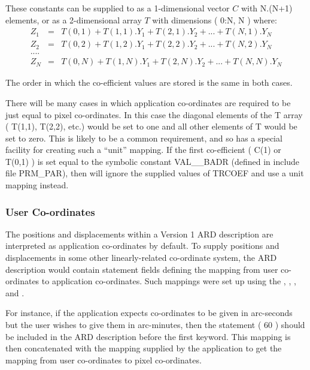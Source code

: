 These constants can be supplied to  as a 1-dimensional vector 
$C$ with N.(N+1) elements, or as a 2-dimensional array $T$ with dimensions 
( 0:N, N ) where:
\small
\begin{eqnarray*}
Z_{1} & = & T(0,1) + T(1,1).Y_{1} + T(2,1).Y_{2} + ... + T(N,1).Y_{N} \\
Z_{2} & = & T(0,2) + T(1,2).Y_{1} + T(2,2).Y_{2} + ... + T(N,2).Y_{N} \\
 ....\\
Z_{N} & = & T(0,N) + T(1,N).Y_{1} + T(2,N).Y_{2} + ... + T(N,N).Y_{N} 
\end{eqnarray*}
\normalsize

The order in which the co-efficient values are stored is the same in both
cases.

There will be many cases in which application co-ordinates are required to be
just equal to pixel co-ordinates. In this case the diagonal elements of the T
array ( T(1,1), T(2,2), etc.) would be set to one and all other elements of T
would be set to zero. This is likely to be a common requirement, and so
 has a special facility for creating such a ``unit'' mapping. If the
first co-efficient ( C(1) or T(0,1) ) is set equal to the symbolic constant
VAL\_\_BADR (defined in include file PRM\_PAR), then  will ignore the
supplied values of TRCOEF and use a unit mapping instead.

\subsubsection{User Co-ordinates}
The positions and displacements within a Version 1 ARD description are 
interpreted as
application co-ordinates by default. To supply positions
and displacements in some other linearly-related co-ordinate system, the ARD 
description would contain statement fields defining the mapping from user
co-ordinates to application co-ordinates. Such mappings were set up using the 
, 
, 
, 
 and
.

For instance, if the application expects co-ordinates to be given in
arc-seconds but the user wishes to give them in arc-minutes, then the
statement ( 60 ) should be included in the ARD
description before the first keyword. This mapping is then concatenated
with the mapping supplied by the application to get the mapping from user
co-ordinates to pixel co-ordinates.

